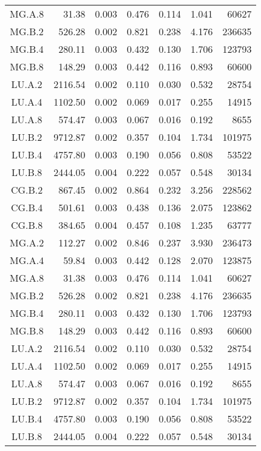 \begin{longtable}[c]{c*{6}{r}}
        MG.A.8 & 31.38 & 0.003 & 0.476 & 0.114 & 1.041 & 60627 \\
        MG.B.2 & 526.28 & 0.002 & 0.821 & 0.238 & 4.176 & 236635 \\
        MG.B.4 & 280.11 & 0.003 & 0.432 & 0.130 & 1.706 & 123793 \\
        MG.B.8 & 148.29 & 0.003 & 0.442 & 0.116 & 0.893 & 60600 \\
        LU.A.2 & 2116.54 & 0.002 & 0.110 & 0.030 & 0.532 & 28754 \\
        LU.A.4 & 1102.50 & 0.002 & 0.069 & 0.017 & 0.255 & 14915 \\
        LU.A.8 & 574.47 & 0.003 & 0.067 & 0.016 & 0.192 & 8655 \\
        LU.B.2 & 9712.87 & 0.002 & 0.357 & 0.104 & 1.734 & 101975 \\
        LU.B.4 & 4757.80 & 0.003 & 0.190 & 0.056 & 0.808 & 53522 \\
        LU.B.8 & 2444.05 & 0.004 & 0.222 & 0.057 & 0.548 & 30134 \\
        CG.B.2 & 867.45 & 0.002 & 0.864 & 0.232 & 3.256 & 228562 \\
        CG.B.4 & 501.61 & 0.003 & 0.438 & 0.136 & 2.075 & 123862 \\
        CG.B.8 & 384.65 & 0.004 & 0.457 & 0.108 & 1.235 & 63777 \\
        MG.A.2 & 112.27 & 0.002 & 0.846 & 0.237 & 3.930 & 236473 \\
        MG.A.4 & 59.84 & 0.003 & 0.442 & 0.128 & 2.070 & 123875 \\
        MG.A.8 & 31.38 & 0.003 & 0.476 & 0.114 & 1.041 & 60627 \\
        MG.B.2 & 526.28 & 0.002 & 0.821 & 0.238 & 4.176 & 236635 \\
        MG.B.4 & 280.11 & 0.003 & 0.432 & 0.130 & 1.706 & 123793 \\
        MG.B.8 & 148.29 & 0.003 & 0.442 & 0.116 & 0.893 & 60600 \\
        LU.A.2 & 2116.54 & 0.002 & 0.110 & 0.030 & 0.532 & 28754 \\
        LU.A.4 & 1102.50 & 0.002 & 0.069 & 0.017 & 0.255 & 14915 \\
        LU.A.8 & 574.47 & 0.003 & 0.067 & 0.016 & 0.192 & 8655 \\
        LU.B.2 & 9712.87 & 0.002 & 0.357 & 0.104 & 1.734 & 101975 \\
        LU.B.4 & 4757.80 & 0.003 & 0.190 & 0.056 & 0.808 & 53522 \\
        LU.B.8 & 2444.05 & 0.004 & 0.222 & 0.057 & 0.548 & 30134 \\

\end{longtable}
